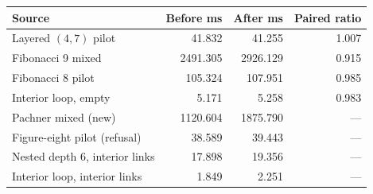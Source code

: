 \begin{center}
\small
\begin{tabular}{lrrr}
\toprule
Source & Before ms & After ms & Paired ratio\\
\midrule
Layered $(4,7)$ pilot & 41.832 & 41.255 & 1.007\\
Fibonacci 9 mixed & 2491.305 & 2926.129 & 0.915\\
Fibonacci 8 pilot & 105.324 & 107.951 & 0.985\\
Interior loop, empty & 5.171 & 5.258 & 0.983\\
Pachner mixed (new) & 1120.604 & 1875.790 & ---\\
Figure-eight pilot (refusal) & 38.589 & 39.443 & ---\\
Nested depth 6, interior links & 17.898 & 19.356 & ---\\
Interior loop, interior links & 1.849 & 2.251 & ---\\
\bottomrule
\end{tabular}
\end{center}
